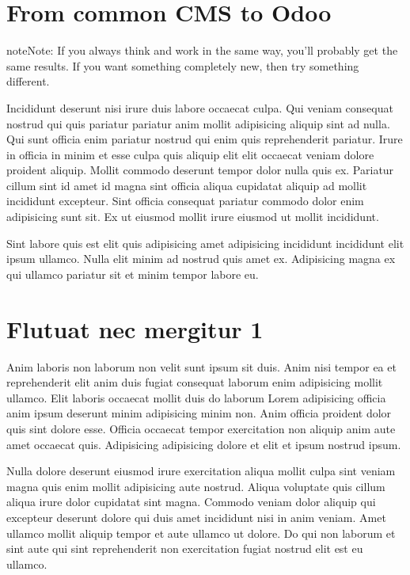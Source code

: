 \documentclass[a4paper,10pt,french]{sphinxmanual}
\begin{document}
\section{From common CMS to Odoo}
\label{\detokenize{docs/guides/autocad-guide02:from-common-cms-to-odoo}}
\begin{sphinxadmonition}{note}{Note:}
If you always think and work in the same way, you’ll probably get the same results. If you want something completely new,  then try something different.

Incididunt deserunt nisi irure duis labore occaecat culpa. Qui veniam consequat nostrud qui quis pariatur pariatur anim mollit adipisicing aliquip sint ad nulla. Qui sunt officia enim pariatur nostrud qui enim quis reprehenderit pariatur. Irure in officia in minim et esse culpa quis aliquip elit elit occaecat veniam dolore proident aliquip. Mollit commodo deserunt tempor dolor nulla quis ex. Pariatur cillum sint id amet id magna sint officia aliqua cupidatat aliquip ad mollit incididunt excepteur. Sint officia consequat pariatur commodo dolor enim adipisicing sunt sit. Ex ut eiusmod mollit irure eiusmod ut mollit incididunt.

Sint labore quis est elit quis adipisicing amet adipisicing incididunt incididunt elit ipsum ullamco. Nulla elit minim ad nostrud quis amet ex. Adipisicing magna ex qui ullamco pariatur sit et minim tempor labore eu.
\end{sphinxadmonition}


\section{Flutuat nec mergitur 1}
\label{\detokenize{docs/guides/autocad-guide02:flutuat-nec-mergitur-1}}
Anim laboris non laborum non velit sunt ipsum sit duis. Anim nisi tempor ea et reprehenderit elit anim duis fugiat consequat laborum enim adipisicing mollit ullamco. Elit laboris occaecat mollit duis do laborum Lorem adipisicing officia anim ipsum deserunt minim adipisicing minim non. Anim officia proident dolor quis sint dolore esse. Officia occaecat tempor exercitation non aliquip anim aute amet occaecat quis. Adipisicing adipisicing dolore et elit et ipsum nostrud ipsum.

Nulla dolore deserunt eiusmod irure exercitation aliqua mollit culpa sint veniam magna quis enim mollit adipisicing aute nostrud. Aliqua voluptate quis cillum aliqua irure dolor cupidatat sint magna. Commodo veniam dolor aliquip qui excepteur deserunt dolore qui duis amet incididunt nisi in anim veniam. Amet ullamco mollit aliquip tempor et aute ullamco ut dolore. Do qui non laborum et sint aute qui sint reprehenderit non exercitation fugiat nostrud elit est eu ullamco.
\end{document}
